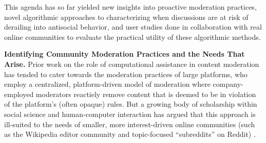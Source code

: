 \documentclass[11pt,letterpaper]{article}
\renewcommand{\section}[1]{\vspace{0.25\baselineskip}\noindent\textbf{#1.}}
\begin{document}
This agenda has so far yielded new insights into proactive moderation practices, novel algorithmic approaches to characterizing when discussions are at risk of derailing into antisocial behavior, and user studies done in collaboration with real online communities to evaluate the practical utility of these algorithmic methods.

\section{Identifying Community Moderation Practices and the Needs That Arise}
Prior work on the role of computational assistance in content moderation has tended to cater towards the moderation practices of large platforms, who employ a centralized, platform-driven model of moderation where company-employed moderators reactiely remove content that is deemed to be in violation of the platform's (often opaque) rules.
But a growing body of scholarship within social science and human-computer interaction has argued that this approach is ill-suited to the needs of smaller, more interest-driven online communities (such as the Wikipedia editor community and topic-focused ``subreddits'' on Reddit) \cite{jurgens_just_2019,seering_reconsidering_2020}.
\end{document}
